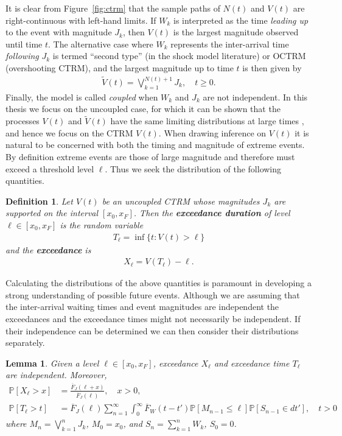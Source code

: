 \documentclass[honours,12pt,twoside, openright]{unswthesis}
\newcommand{\pr}{\mathbb {P}}
\newcommand{\1}{\mathbf 1}
\newtheorem{lemma}[equation]{Lemma}
\newtheorem{definition}[equation]{Definition}
\numberwithin{equation}{section}
\theoremstyle{definition}
\theoremstyle{remark}
\begin{document}
It is clear from Figure~\ref{fig:ctrm} that the sample paths of $N(t)$ and $V(t)$ are right-continuous
with left-hand limits. 
If $W_k$ is interpreted as the time \emph{leading up} to the event with magnitude
$J_k$, then $V(t)$ is the largest magnitude observed until time $t$.
The alternative case where $W_k$ represents the inter-arrival time 
\textit{following} $J_k$ 
is termed ``second type'' (in the shock model literature) or OCTRM
(overshooting CTRM), and the largest magnitude up to time $t$ is then
given by
\begin{align}
\tilde V(t) = \bigvee_{k=1}^{N(t)+1} J_k, \quad t \ge 0.
\end{align}
Finally, the model is called \emph{coupled} when $W_k$ and $J_k$ are not independent.
In this thesis we focus on the uncoupled case,  
for which it can be shown that the processes $V(t)$ and
$\tilde V(t)$ have the same limiting distributions at large times
\cite{Heesa}, and hence we focus on the CTRM $V(t)$. When drawing inference on $V(t)$ it is natural to be concerned with both the timing and magnitude of extreme events. By definition extreme events are those of large magnitude and therefore must exceed a threshold level $\ell$. Thus we seek the distribution of the following quantities.\\
\begin{definition}
Let $V(t)$ be an uncoupled CTRM whose magnitudes $J_k$ are supported on the interval
$[x_0, x_F]$.  Then the \textbf{exceedance duration} of level $\ell \in [x_0,x_F]$ is
the random variable
\begin{align*}
T_\ell = \inf\{t: V(t) > \ell\}
\end{align*}
and the \textbf{exceedance} is 
\begin{align*}
X_\ell = V(T_\ell) - \ell.
\end{align*}
\end{definition}
Calculating the distributions of the above quantities is paramount in developing a strong understanding of possible future events. Although we are assuming that the inter-arrival waiting times and event magnitudes are independent the exceedances and the exceedance times might not necessarily be independent. If their independence can be determined we can then consider their distributions separately.
\begin{lemma}\label{lem:independence}
Given a level $\ell \in [x_0,x_F]$, exceedance $X_\ell$ and exceedance time
$T_\ell$ are independent. Moreover, 
\begin{align*}
\pr[X_\ell > x]
&= \frac{\overline F_J(\ell + x)}{\overline F_J(\ell)}, \quad x > 0,
\\
\pr[T_\ell > t]
&= \overline F_J(\ell) \sum_{n=1}^\infty \int_0^\infty \overline F_W(t-t') \pr[M_{n-1} \le \ell]
\pr[S_{n-1} \in dt'], \quad t > 0
\end{align*}
where $M_n = \bigvee_{k=1}^n J_k$, $M_0 = x_0$, and $S_n = \sum_{k=1}^n W_k$,
$S_0 = 0$.
\end{lemma}
\end{document}
